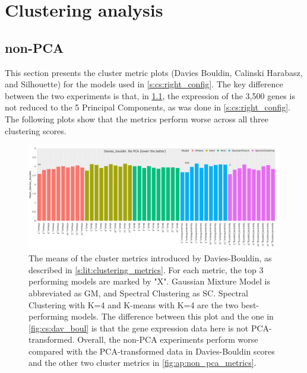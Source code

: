 \chapter{Clustering analysis} \label{s:ap:cs}

\newpage 

\section{non-PCA} \label{s:ap:non-pca}

This section presents the cluster metric plots (Davies Bouldin, Calinski Harabasz, and Silhouette) for the models used in \cref{s:cs:right_config}. The key difference between the two experiments is that, in \cref{s:ap:non-pca}, the expression of the 3,500 genes is not reduced to the 5 Principal Components, as was done in \cref{s:cs:right_config}. The following plots show that the metrics perform worse across all three clustering scores.


\begin{figure}[!htb]    
    \centering
    \includegraphics[width=1.0\textwidth,keepaspectratio]{Sections/ClusteringAnalysis/Resources/cs_top3/non_PCA_top3_Davies_bouldin.png}
    \caption{The means of the cluster metrics introduced by Davies-Bouldin, as described in \cref{s:lit:clustering_metrics}. For each metric, the top 3 performing models are marked by "X". Gaussian Mixture Model is abbreviated as GM, and Spectral Clustering as SC. Spectral Clustering with K=4 and K-means with K=4 are the two best-performing models. The difference between this plot and the one in \cref{fig:cs:dav_boul} is that the gene expression data here is not PCA-transformed. Overall, the non-PCA experiments perform worse compared with the PCA-transformed data in Davies-Bouldin scores and the other two cluster metrics in \cref{fig:ap:non_pca_metrics}.}
    \label{fig:ap:non_pca_dav_boul}
\end{figure}



